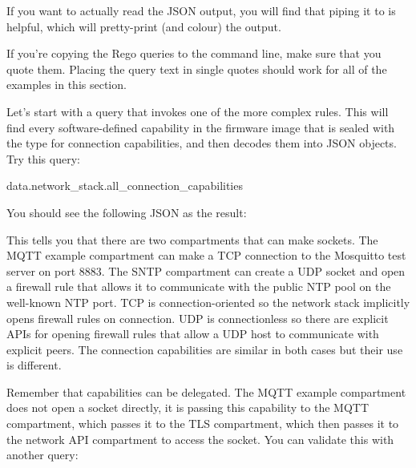 If you want to actually read the JSON output, you will find that piping it to  is helpful, which will pretty-print (and colour) the output.

\begin{note}
If you're copying the Rego queries to the command line, make sure that you quote them.
Placing the query text in single quotes should work for all of the examples in this section.
\end{note}

Let's start with a query that invokes one of the more complex rules.
This will find every software-defined capability in the firmware image that is sealed with the type for connection capabilities, and then decodes them into JSON objects.
Try this query:

\begin{regosnippet}
data.network_stack.all_connection_capabilities
\end{regosnippet}

You should see the following JSON as the result:

\begin{jsonsnippet}
[
  {
    "capability": {
      "connection_type": "UDP",
      "host": "pool.ntp.org",
      "port": 123
    \},
    "owner": "SNTP"
  \},
  {
    "capability": {
      "connection_type": "TCP",
      "host": "test.mosquitto.org",
      "port": 8883
    \},
    "owner": "mqtt_example"
  \}
]
\end{jsonsnippet}

This tells you that there are two compartments that can make sockets.
The MQTT example compartment can make a TCP connection to the Mosquitto test server on port 8883.
The SNTP compartment can create a UDP socket and open a firewall rule that allows it to communicate with the public NTP pool on the well-known NTP port.
TCP is connection-oriented so the network stack implicitly opens firewall rules on connection.
UDP is connectionless so there are explicit APIs for opening firewall rules that allow a UDP host to communicate with explicit peers.
The connection capabilities are similar in both cases but their use is different.

Remember that capabilities can be delegated.
The MQTT example compartment does not open a socket directly, it is passing this capability to the MQTT compartment, which passes it to the TLS compartment, which then passes it to the network API compartment to access the socket.
You can validate this with another query:



